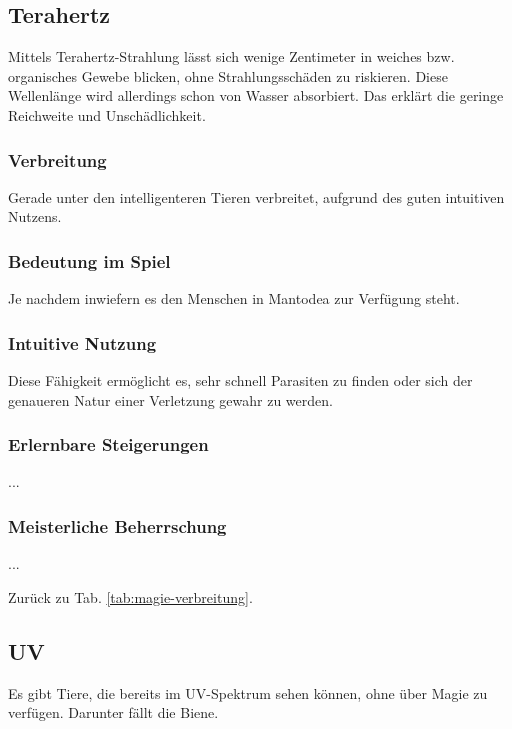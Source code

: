 \subsection{Terahertz}\label{magie:terahertz}
Mittels Terahertz-Strahlung lässt sich wenige Zentimeter in weiches bzw. organisches Gewebe blicken, ohne Strahlungsschäden zu riskieren.
Diese Wellenlänge wird allerdings schon von Wasser absorbiert.
Das erklärt die geringe Reichweite und Unschädlichkeit.

\subsubsection{Verbreitung}
Gerade unter den intelligenteren Tieren verbreitet, aufgrund des guten intuitiven Nutzens.

\subsubsection{Bedeutung im Spiel}
Je nachdem inwiefern es den Menschen in Mantodea zur Verfügung steht. %

\subsubsection{Intuitive Nutzung}
Diese Fähigkeit ermöglicht es, sehr schnell Parasiten zu finden oder sich der genaueren Natur einer Verletzung gewahr zu werden.

\subsubsection{Erlernbare Steigerungen}
\begin{outline}
	\1 ...
\end{outline}

\subsubsection{Meisterliche Beherrschung} 
\begin{outline}
	\1 ...
\end{outline}
Zurück zu Tab. \ref{tab:magie-verbreitung}.



\subsection{UV}\label{magie:uv}
Es gibt Tiere, die bereits im UV-Spektrum sehen können, ohne über Magie zu verfügen. 
Darunter fällt die Biene.

